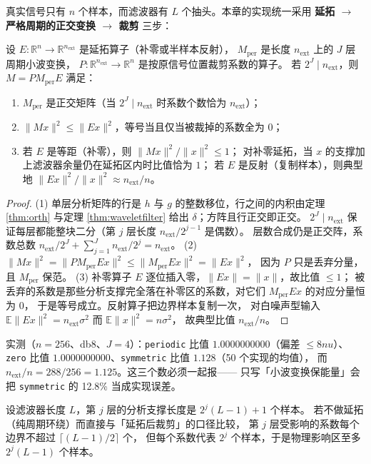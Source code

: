 真实信号只有 $n$ 个样本，而滤波器有 $L$ 个抽头。本章的实现统一采用
\textbf{延拓 $\to$ 严格周期的正交变换 $\to$ 裁剪} 三步：

\begin{theorem}[延拓三步法的正确性]
\label{thm:extension}
设 $E:\mathbb{R}^n\to\mathbb{R}^{n_{\text{ext}}}$ 是延拓算子（补零或半样本反射），
$M_{\text{per}}$ 是长度 $n_{\text{ext}}$ 上的 $J$ 层周期小波变换，
$P:\mathbb{R}^{n_{\text{ext}}}\to\mathbb{R}^{n}$ 是按原信号位置裁剪系数的算子。
若 $2^J\mid n_{\text{ext}}$，则 $M=PM_{\text{per}}E$ 满足：
\begin{enumerate}
  \item $M_{\text{per}}$ 是正交矩阵（当 $2^J\mid n_{\text{ext}}$ 时系数个数恰为 $n_{\text{ext}}$）；
  \item $\|Mx\|^2\le\|Ex\|^2$，等号当且仅当被裁掉的系数全为 $0$；
  \item 若 $E$ 是等距（补零），则 $\|Mx\|^2/\|x\|^2\le1$；
        对补零延拓，当 $x$ 的支撑加上滤波器余量仍在延拓区内时比值恰为 $1$；
        若 $E$ 是反射（复制样本），则典型地 $\|Ex\|^2/\|x\|^2\approx n_{\text{ext}}/n$。
\end{enumerate}
\end{theorem}

\begin{proof}
(1) 单层分析矩阵的行是 $h$ 与 $g$ 的整数移位，行之间的内积由定理 \ref{thm:orth}
与定理 \ref{thm:waveletfilter} 给出 $\delta$；方阵且行正交即正交。
$2^J\mid n_{\text{ext}}$ 保证每层都能整块二分（第 $j$ 层长度 $n_{\text{ext}}/2^{j-1}$ 是偶数）。
层数合成仍是正交阵，系数总数
$n_{\text{ext}}/2^J+\sum_{j=1}^{J}n_{\text{ext}}/2^j=n_{\text{ext}}$。
(2) $\|Mx\|^2=\|PM_{\text{per}}Ex\|^2\le\|M_{\text{per}}Ex\|^2=\|Ex\|^2$，
因为 $P$ 只是丢弃分量，且 $M_{\text{per}}$ 保范。
(3) 补零算子 $E$ 逐位插入零，$\|Ex\|=\|x\|$，故比值 $\le1$；
被丢弃的系数是那些分析支撑完全落在补零区的系数，对它们 $M_{\text{per}}Ex$ 的对应分量恒为 $0$，
于是等号成立。反射算子把边界样本复制一次，
对白噪声型输入 $\mathbb{E}\|Ex\|^2=n_{\text{ext}}\sigma^2$ 而 $\mathbb{E}\|x\|^2=n\sigma^2$，
故典型比值 $n_{\text{ext}}/n$。
\end{proof}

实测（$n=256$、db8、$J=4$）：\texttt{periodic} 比值 $1.0000000000$（偏差 $\le8nu$）、
\texttt{zero} 比值 $1.0000000000$、\texttt{symmetric} 比值 $1.128$（50 个实现的均值），
而 $n_{\text{ext}}/n=288/256=1.125$。这三个数必须一起报——
只写「小波变换保能量」会把 \texttt{symmetric} 的 12.8\% 当成实现误差。

\begin{theorem}
\label{thm:pollution}
设滤波器长度 $L$，第 $j$ 层的分析支撑长度是 $2^j(L-1)+1$ 个样本。
若不做延拓（纯周期环绕）而直接与「延拓后裁剪」的口径比较，
第 $j$ 层受影响的系数每个边界不超过 $\lceil (L-1)/2\rceil$ 个，
但每个系数代表 $2^j$ 个样本，于是物理影响区至多 $2^j(L-1)$ 个样本。
\end{theorem}

